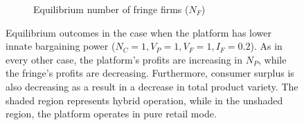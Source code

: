 \documentclass[a4paper]{article}
\begin{document}
\begin{figure}
\begin{subfigure}[b]{0.45\textwidth}
        \caption{Equilibrium number of fringe firms ($N_F$)}
    \end{subfigure}
    \caption{Equilibrium outcomes in the case when the platform has lower innate bargaining power ($N_C = 1, V_P = 1, V_F = 1, I_F = 0.2$). As in every other case, the platform's profits are increasing in $N_P$, while the fringe's profits are decreasing. Furthermore, consumer surplus is also decreasing as a result in a decrease in total product variety. The shaded region represents hybrid operation, while in the unshaded region, the platform operates in pure retail mode.}
    \label{fig:equilibrium_low_lambda}
\end{figure}
\end{document}
